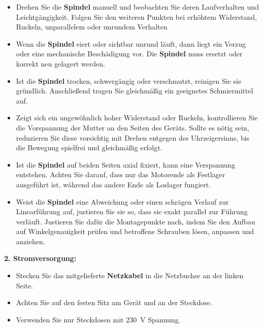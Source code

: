 \documentclass[a4paper,12pt]{report}
\begin{document}
	    \begin{itemize}[leftmargin=1.5em]
		
		\item Drehen Sie die \textbf{Spindel} manuell und beobachten Sie deren Laufverhalten und Leichtgängigkeit. Folgen Sie den weiteren Punkten bei erhöhtem Widerstand, Ruckeln, unparallelem oder unrundem Verhalten 
		
		\item Wenn die \textbf{Spindel} eiert oder sichtbar unrund läuft, dann liegt ein Verzug oder eine mechanische Beschädigung vor. Die \textbf{Spindel} muss ersetzt oder korrekt neu gelagert werden.
		
		\item Ist die \textbf{Spindel} trocken, schwergängig oder verschmutzt, reinigen Sie sie gründlich. Anschließend tragen Sie gleichmäßig ein geeignetes Schmiermittel auf. 
		
		\item Zeigt sich ein ungewöhnlich hoher Widerstand oder Ruckeln, kontrollieren Sie die Vorspannung der Mutter an den Seiten des Geräts. Sollte es nötig sein, reduzieren Sie diese vorsichtig mit Drehen entgegen des Uhrzeigersinns, bis die Bewegung spielfrei und gleichmäßig erfolgt. 
		
		\item Ist die \textbf{Spindel} auf beiden Seiten axial fixiert, kann eine Verspannung entstehen. Achten Sie darauf, dass nur das Motorende als Festlager ausgeführt ist, während das andere Ende als Loslager fungiert.
		
		\item Weist die \textbf{Spindel} eine Abweichung oder einen schrägen Verlauf zur Linearführung auf, justieren Sie sie so, dass sie exakt parallel zur Führung verläuft. Justieren Sie dafür die Montagepunkte nach, indem Sie den Aufbau auf Winkelgenauigkeit prüfen und betroffene Schrauben lösen, anpassen und anziehen.\\ 
	    \end{itemize}
		
		
		\noindent\textbf{2. Stromversorgung:}
		
		\begin{itemize}[leftmargin=1.5em]
		
		\item Stecken Sie das mitgelieferte \textbf{Netzkabel} in die Netzbuchse an der linken Seite. 
		\item Achten Sie auf den festen Sitz am Gerät und an der Steckdose. 
		\item Verwenden Sie nur Steckdosen mit 230\ V Spannung. \\
    	\end{itemize}
		
\end{document}
